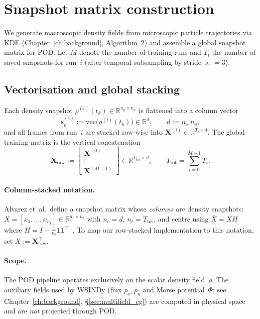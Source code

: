 \documentclass{report}
\theoremstyle{plain}
\theoremstyle{remark}
\numberwithin{equation}{section}              %
\begin{document}
%
\section{Snapshot matrix construction}
\label{sec:snapshot_matrix}

We generate macroscopic density fields from microscopic particle trajectories
via KDE (Chapter~\ref{ch:background}, Algorithm~2) and assemble a global
snapshot matrix for POD.  Let $M$ denote the number of training runs and
$T_i$ the number of saved snapshots for run~$i$ (after temporal subsampling
by stride~$s$; ${}=3$).

\subsection{Vectorisation and global stacking}
\label{subsec:vectorization}

Each density snapshot $\rho^{(i)}(t_k)\in\mathbb{R}^{n_y\times n_x}$ is
flattened into a column vector
\[
  \mathbf{s}^{(i)}_k := \mathrm{vec}\!\bigl(\rho^{(i)}(t_k)\bigr)
  \in\mathbb{R}^{d},\qquad d:=n_x\,n_y,
\]
and all frames from run~$i$ are stacked row-wise into
$\mathbf{X}^{(i)}\in\mathbb{R}^{T_i\times d}$.  The global training matrix
is the vertical concatenation
\[
  \mathbf{X}_{\mathrm{raw}}
  :=\begin{bmatrix}
      \mathbf{X}^{(0)}\\\vdots\\\mathbf{X}^{(M-1)}
    \end{bmatrix}
  \in\mathbb{R}^{T_{\mathrm{tot}}\times d},\qquad
  T_{\mathrm{tot}}=\sum_{i=0}^{M-1}T_i.
\]

\paragraph{Column-stacked notation.}
\label{subsec:column_notation}
Alvarez et~al.\ define a snapshot matrix whose \emph{columns} are density
snapshots: $X=[x_1,\dots,x_{n_t}]\in\mathbb{R}^{n_c\times n_t}$ with
$n_c{=}d$, $n_t{=}T_{\mathrm{tot}}$, and centre using $\bar{X}=XH$ where
$H=I-\tfrac{1}{n_t}\mathbf{1}\mathbf{1}^\top$~\cite{alvarez2025eqfree}.
To map our row-stacked implementation to this notation, set
$X:=\mathbf{X}_{\mathrm{raw}}^\top$.

\paragraph{Scope.}
The POD pipeline operates exclusively on the scalar density field~$\rho$.
The auxiliary fields used by WSINDy (flux $p_x,p_y$ and Morse potential~$\Phi$;
see Chapter~\ref{ch:background}, \S\ref{sec:multifield_cg}) are computed
in physical space and are \emph{not} projected through POD.
\end{document}
